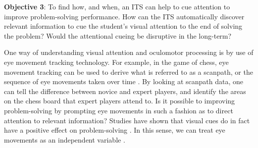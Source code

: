 \documentclass[hidelinks,11pt]{article}
\begin{document}


\textbf{Objective 3}: To find how, and when, an ITS can help to cue attention
to improve problem-solving performance.  How can the ITS automatically discover
relevant information to cue the student's visual attention to the end of
solving the problem?  Would the attentional cueing be disruptive in the
long-term?

One way of understanding visual attention and oculomotor processing is by use
of eye movement tracking technology.  For example, in the game of chess, eye
movement tracking can be used to derive what is referred to as a scanpath, or
the sequence of eye movements taken over time {\citep{reingold2011}}.  By
looking at scanpath data, one can tell the difference between novice and expert
players, and identify the areas on the chess board that expert players attend
to.  Is it possible to improving problem-solving by prompting eye movements in
such a fashion as to direct attention to relevant information?  Studies have
shown that visual cues do in fact have a positive effect on problem-solving
{\citep{grant2003, rouinfar2014}}. In this sense, we can treat eye movements as
an independent variable {\citep{reingold2011}}.
\end{document}
